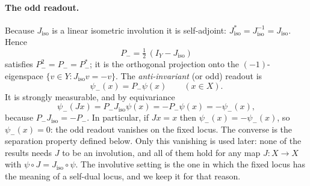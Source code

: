 \documentclass[11pt]{article}
\newcommand{\Pminus}{P_{-}}
\newcommand{\psim}{\psi_{-}}
\newcommand{\Jiso}{J_{\mathrm{iso}}}
\theoremstyle{definition}
\begin{document}
\paragraph{The odd readout.}
Because \(\Jiso\) is a linear isometric involution it is self-adjoint:
\(\Jiso^*=\Jiso^{-1}=\Jiso\).  Hence
\[
  \Pminus=\tfrac12\,(I_Y-\Jiso)
\]
satisfies \(\Pminus^2=\Pminus=\Pminus^*\); it is the orthogonal
projection onto the \((-1)\)-eigenspace \(\{v\in Y:\Jiso v=-v\}\).
The \emph{anti-invariant} (or odd) readout is
\[
  \psim(x)=\Pminus\psi(x)\qquad(x\in X).
\]
It is strongly measurable, and by equivariance
\[
  \psim(Jx)=\Pminus\Jiso\psi(x)=-\Pminus\psi(x)=-\psim(x),
\]
because \(\Pminus\Jiso=-\Pminus\).  In particular, if \(Jx=x\) then
\(\psim(x)=-\psim(x)\), so \(\psim(x)=0\): the odd readout vanishes on
the fixed locus.  The converse is the separation property defined
below.  Only this vanishing is used later: none of the results needs
\(J\) to be an involution, and all of them hold for any map
\(J:X\to X\) with \(\psi\circ J=\Jiso\circ\psi\).  The involutive
setting is the one in which the fixed locus has the meaning of a
self-dual locus, and we keep it for that reason.
\end{document}
